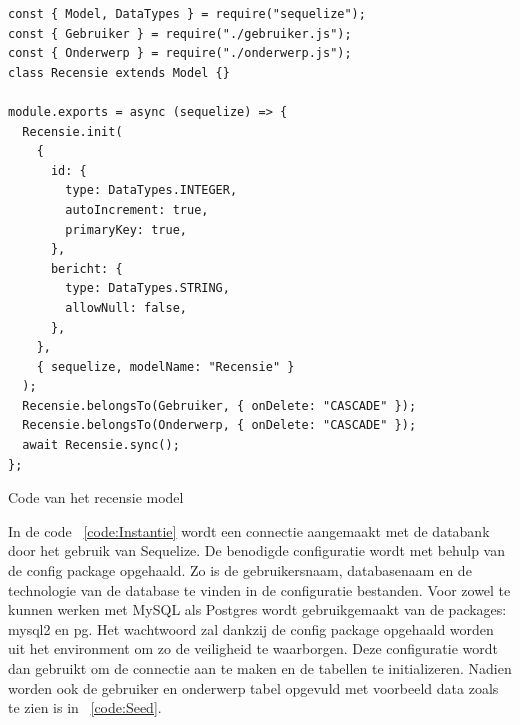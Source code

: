 \begin{listing}[H]
  \centering
  \begin{verbatim}
const { Model, DataTypes } = require("sequelize");
const { Gebruiker } = require("./gebruiker.js");
const { Onderwerp } = require("./onderwerp.js");
class Recensie extends Model {}

module.exports = async (sequelize) => {
  Recensie.init(
    {
      id: {
        type: DataTypes.INTEGER,
        autoIncrement: true,
        primaryKey: true,
      },
      bericht: {
        type: DataTypes.STRING,
        allowNull: false,
      },
    },
    { sequelize, modelName: "Recensie" }
  );
  Recensie.belongsTo(Gebruiker, { onDelete: "CASCADE" });
  Recensie.belongsTo(Onderwerp, { onDelete: "CASCADE" });
  await Recensie.sync();
};
\end{verbatim}
\caption{\label{code:Review}Code van het recensie model}
\end{listing}

In de code ~\ref{code:Instantie} wordt een connectie aangemaakt met de databank door het gebruik van Sequelize. 
De benodigde configuratie wordt met behulp van de config package opgehaald. Zo is de 
gebruikersnaam, databasenaam en de technologie van de database te vinden in de configuratie bestanden.
Voor zowel te kunnen werken met MySQL als Postgres wordt gebruikgemaakt van de packages: mysql2 en pg.
Het wachtwoord zal dankzij de config package opgehaald worden uit het environment om zo de veiligheid te waarborgen.
Deze configuratie wordt dan gebruikt om de connectie aan te maken en de tabellen te initializeren.
Nadien worden ook de gebruiker en onderwerp tabel opgevuld met voorbeeld data zoals te zien is in ~\ref{code:Seed}.


